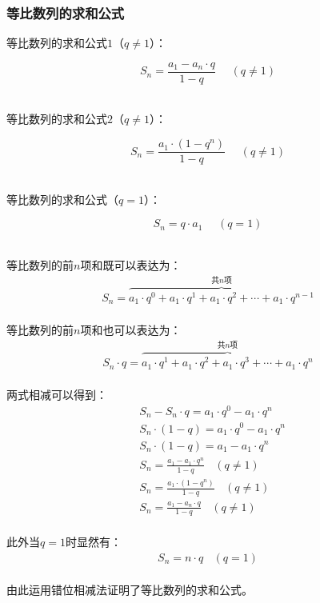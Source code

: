 \documentclass[UTF8]{ctexart}
\begin{document}
\newpage

\subsubsection{等比数列的求和公式}
    \setcounter{equation}{0}
    等比数列的求和公式$1$（$q\neq 1$）：
    \begin{large}
        \begin{equation*}
            S_n=\frac{a_1-a_n\cdot q}{1-q}~~~~~~(q\neq 1)
        \end{equation*}
    \end{large}\\
    等比数列的求和公式$2$（$q\neq 1$）：
    \begin{large}
        \begin{equation*}
            S_n=\frac{a_1\cdot(1-q^n)}{1-q}~~~~~~(q\neq 1)
        \end{equation*}
    \end{large}\\
    等比数列的求和公式（$q=1$）：
    \begin{large}
        \begin{equation*}
            S_n=q\cdot a_1~~~~~~(q=1)
        \end{equation*}
    \end{large}\\
    等比数列的前$n$项和既可以表达为：
    \begin{align}
        S_n=\overbrace{a_1\cdot q^0+a_1\cdot q^1+a_1\cdot q^2+\cdots+a_1\cdot q^{n-1}}^{\text{共}n\text{项}}
    \end{align}\\
    等比数列的前$n$项和也可以表达为：
    \begin{align}
        S_n\cdot q=\overbrace{a_1\cdot q^1+a_1\cdot q^2+a_1\cdot q^3+\cdots+a_1\cdot q^{n}}^{\text{共}n\text{项}}
    \end{align}\\
    两式相减可以得到：
    \begin{align}
        &S_n-S_n\cdot q=a_1\cdot q^0-a_1\cdot q^n\\[2.5mm]
        &S_n\cdot(1-q)=a_1\cdot q^0-a_1\cdot q^n\\[2.5mm]
        &S_n\cdot(1-q)=a_1-a_1\cdot q^n\\[2.5mm]
        &S_n=\frac{a_1-a_1\cdot q^n}{1-q}~~~~(q\neq 1)\\[2.5mm]
        &S_n=\frac{a_1\cdot(1-q^n)}{1-q}~~~~(q\neq 1)\\[2.5mm]
        &S_n=\frac{a_1-a_n\cdot q}{1-q}~~~~(q\neq 1)
    \end{align}\\
    此外当$q=1$时显然有：
    \begin{align}
        S_n=n\cdot q~~~~(q=1)
    \end{align}\\
    由此运用错位相减法证明了等比数列的求和公式。
\end{document}
